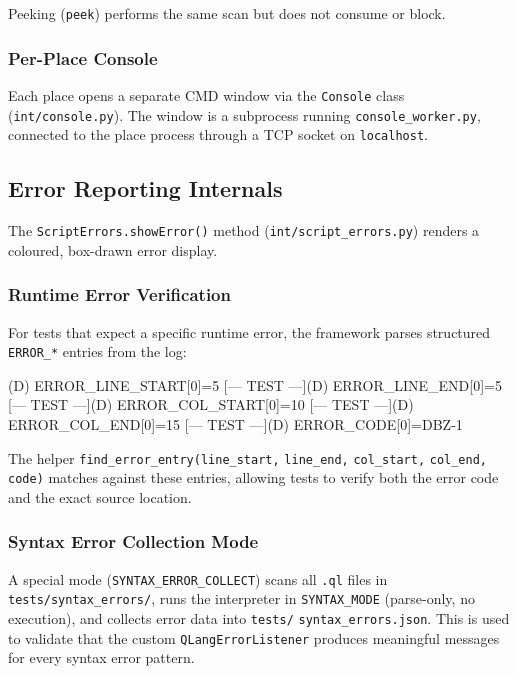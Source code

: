 Peeking (\texttt{peek}) performs the same scan but does not consume
or block.

\subsubsection{Per-Place Console}

Each place opens a separate CMD window via the \texttt{Console} class
(\texttt{int/console.py}).  The window is a subprocess running
\texttt{console\_worker.py}, connected to the place process through a
TCP socket on \texttt{localhost}.

\subsection{Error Reporting Internals}
\label{sec:impl-errors}

The \texttt{ScriptErrors.showError()} method (\texttt{int/script\_errors.py})
renders a coloured, box-drawn error display.

\subsubsection{Runtime Error Verification}

For tests that expect a specific runtime error, the framework parses
structured \texttt{ERROR\_*} entries from the log:

\begin{codebox}
[--- TEST ---](D) ERROR_LINE_START[0]=5
[--- TEST ---](D) ERROR_LINE_END[0]=5
[--- TEST ---](D) ERROR_COL_START[0]=10
[--- TEST ---](D) ERROR_COL_END[0]=15
[--- TEST ---](D) ERROR_CODE[0]=DBZ-1
\end{codebox}

The helper \texttt{find\_error\_entry(line\_start,} \texttt{line\_end,}
\texttt{col\_start,} \texttt{col\_end,} \texttt{code)} matches against these entries, allowing tests to verify
both the error code and the exact source location.

\subsubsection{Syntax Error Collection Mode}

A special mode (\texttt{SYNTAX\_ERROR\_COLLECT}) scans all \texttt{.ql}
files in \texttt{tests/syntax\_errors/}, runs the interpreter in
\texttt{SYNTAX\_MODE} (parse-only, no execution), and collects error data
into \texttt{tests/} \texttt{syntax\_errors.json}.  This is used to validate that
the custom \texttt{QLangErrorListener} produces meaningful messages for
every syntax error pattern.

